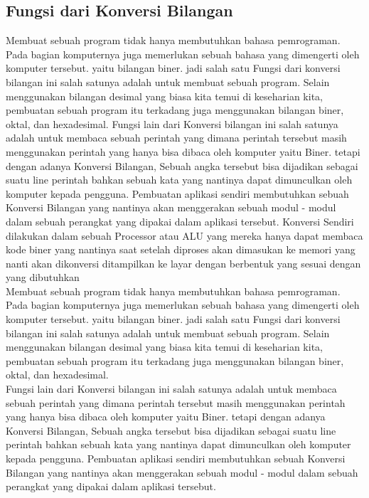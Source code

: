 {\begin{itemize}
\begin{itemize}
\section{Fungsi dari Konversi Bilangan} %
Membuat sebuah program tidak hanya membutuhkan bahasa pemrograman. Pada bagian komputernya juga memerlukan sebuah bahasa yang dimengerti oleh komputer tersebut. yaitu bilangan biner. jadi salah satu Fungsi dari konversi bilangan ini salah satunya adalah untuk membuat sebuah program. Selain menggunakan bilangan desimal yang biasa kita temui di keseharian kita, pembuatan sebuah program itu terkadang juga menggunakan bilangan biner, oktal, dan hexadesimal.
Fungsi lain dari Konversi bilangan ini salah satunya adalah untuk membaca sebuah perintah yang dimana perintah tersebut masih menggunakan perintah yang hanya bisa dibaca oleh komputer yaitu Biner. tetapi dengan adanya Konversi Bilangan, Sebuah angka tersebut bisa dijadikan sebagai suatu line perintah bahkan sebuah kata yang nantinya dapat dimunculkan oleh komputer kepada pengguna. Pembuatan aplikasi sendiri membutuhkan sebuah Konversi Bilangan yang nantinya akan menggerakan sebuah modul - modul dalam sebuah perangkat yang dipakai dalam aplikasi tersebut. 
Konversi Sendiri dilakukan dalam sebuah Processor atau ALU yang mereka hanya dapat membaca kode biner yang nantinya saat setelah diproses akan dimasukan ke memori yang nanti akan dikonversi ditampilkan ke layar dengan berbentuk yang sesuai dengan yang dibutuhkan
\\Membuat sebuah program tidak hanya membutuhkan bahasa pemrograman. Pada bagian komputernya juga memerlukan sebuah bahasa yang dimengerti oleh komputer tersebut. yaitu bilangan biner. jadi salah satu Fungsi dari konversi bilangan ini salah satunya adalah untuk membuat sebuah program. Selain menggunakan bilangan desimal yang biasa kita temui di keseharian kita, pembuatan sebuah program itu terkadang juga menggunakan bilangan biner, oktal, dan hexadesimal.
\\Fungsi lain dari Konversi bilangan ini salah satunya adalah untuk membaca sebuah perintah yang dimana perintah tersebut masih menggunakan perintah yang hanya bisa dibaca oleh komputer yaitu Biner. tetapi dengan adanya Konversi Bilangan, Sebuah angka tersebut bisa dijadikan sebagai suatu line perintah bahkan sebuah kata yang nantinya dapat dimunculkan oleh komputer kepada pengguna. Pembuatan aplikasi sendiri membutuhkan sebuah Konversi Bilangan yang nantinya akan menggerakan sebuah modul - modul dalam sebuah perangkat yang dipakai dalam aplikasi tersebut. 


\end{itemize}
\end{itemize}}
